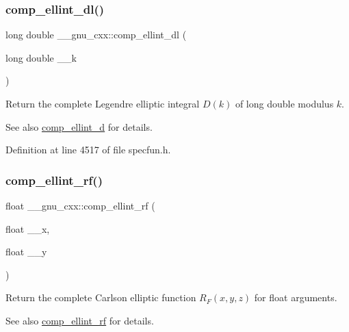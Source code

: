 \subsubsection{\texorpdfstring{comp\+\_\+ellint\+\_\+dl()}{comp\_ellint\_dl()}}
{\footnotesize\ttfamily long double \+\_\+\+\_\+gnu\+\_\+cxx\+::comp\+\_\+ellint\+\_\+dl (\begin{DoxyParamCaption}\item[{long double}]{\+\_\+\+\_\+k }\end{DoxyParamCaption})\hspace{0.3cm}{\ttfamily [inline]}}

Return the complete Legendre elliptic integral $ D(k) $ of {\ttfamily long double} modulus $ k $.

\begin{DoxySeeAlso}{See also}
\hyperlink{group__gnu__math__spec__func_ga3fe79a91524b43ffc5ffb83c0eb2bd00}{comp\+\_\+ellint\+\_\+d} for details. 
\end{DoxySeeAlso}


Definition at line 4517 of file specfun.\+h.

\mbox{\label{group__gnu__math__spec__func_ga55ae30b4f8ff15017d18a80050e14e38}} 
\subsubsection{\texorpdfstring{comp\+\_\+ellint\+\_\+rf()}{comp\_ellint\_rf()}\hspace{0.1cm}{\footnotesize\ttfamily [1/3]}}
{\footnotesize\ttfamily float \+\_\+\+\_\+gnu\+\_\+cxx\+::comp\+\_\+ellint\+\_\+rf (\begin{DoxyParamCaption}\item[{float}]{\+\_\+\+\_\+x,  }\item[{float}]{\+\_\+\+\_\+y }\end{DoxyParamCaption})\hspace{0.3cm}{\ttfamily [inline]}}

Return the complete Carlson elliptic function $ R_F(x,y,z) $ for {\ttfamily float} arguments.

\begin{DoxySeeAlso}{See also}
\hyperlink{group__gnu__math__spec__func_ga55ae30b4f8ff15017d18a80050e14e38}{comp\+\_\+ellint\+\_\+rf} for details. 
\end{DoxySeeAlso}


